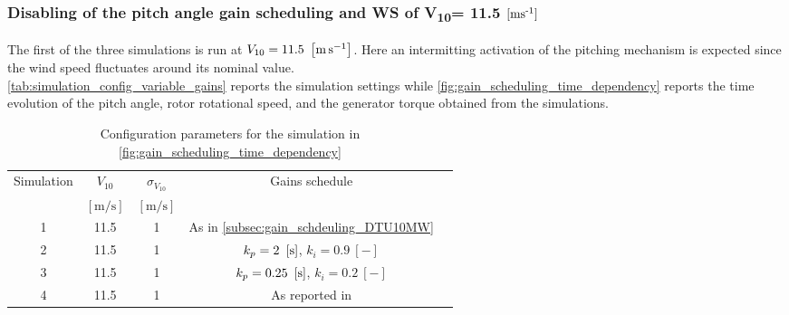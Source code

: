 \subsubsection{Disabling of the pitch angle gain scheduling and WS of V\textsubscript{10}= 11.5 $\left[ \text{ms}\textsuperscript{-1} \right]$}
The first of the three simulations is run at $V_{10} = 11.5 \ \left[\si{\meter\per\second}\right]$. Here an intermitting activation of the pitching mechanism is expected since the wind speed fluctuates around its nominal value.\\
\autoref{tab:simulation_config_variable_gains} reports the simulation settings while \autoref{fig:gain_scheduling_time_dependency} reports the time evolution of the pitch angle, rotor rotational speed, and the generator torque obtained from the simulations. 

\begin{table}[htb]
  \caption{Configuration parameters for the simulation in \autoref{fig:gain_scheduling_time_dependency}}
  \centering
  \begin{tabular}{ccccc}
  \toprule
    Simulation & $V_{10}$  & $\sigma_{V_{10}}$ & Gains schedule \\ 
     & $\left[\si{\meter\per\second}\right]$ & $\left[\si{\meter\per\second}\right]$ & \\ \midrule       
     1 & 11.5 & 1 & As in \autoref{subsec:gain_schdeuling_DTU10MW}  \\
     2 & 11.5 & 1 & $k_p = 2 \ \mesunt{\second}$, $k_i=0.9 \ [-]$ \\
     3 & 11.5 & 1 & $k_p = 0.25 \ \mesunt{\second}$, $k_i=0.2 \ [-]$  \\
     4 & 11.5 & 1 & As reported in \cite{Olimpo_Anaya‐Lara}  \\
     \bottomrule
  \end{tabular}
  \label{tab:simulation_config_variable_gains}
\end{table}

